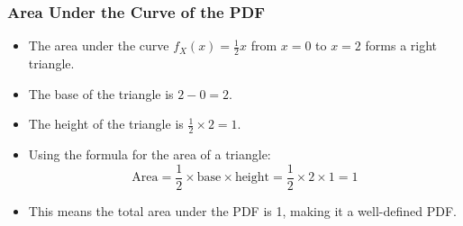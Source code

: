 \documentclass[handout]{beamer} %
\begin{document}
\begin{frame}
\frametitle{Area Under the Curve of the PDF}
    \begin{itemize}
        \item The area under the curve \(f_X(x) = \frac{1}{2}x\) from \(x=0\) to \(x=2\) forms a right triangle.
        \item The base of the triangle is \(2-0 = 2\).
        \item The height of the triangle is \(\frac{1}{2} \times 2 = 1\). \pause 
        \item Using the formula for the area of a triangle: \pause 
        \[
        \text{Area} = \frac{1}{2} \times \text{base} \times \text{height} = \frac{1}{2} \times 2 \times 1 = 1
        \] \pause
        \item This means the total area under the PDF is 1, making it a well-defined PDF.
    \end{itemize}
\end{frame}
\end{document}
